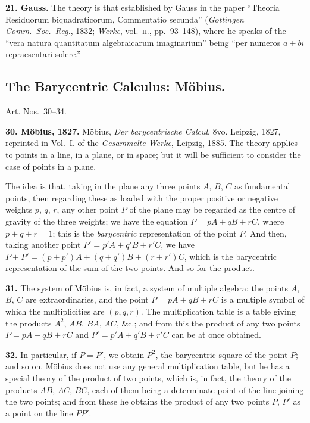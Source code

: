 \documentclass[11pt,a4paper]{article}
\theoremstyle{definition}
\begin{document}
\textbf{21. Gauss.} The theory is that established by Gauss in the paper ``Theoria Residuorum biquadraticorum, Commentatio secunda'' (\textit{Gottingen Comm.\ Soc.\ Reg.}, 1832; \textit{Werke}, vol.~\textsc{ii}., pp.~93--148), where he speaks of the ``vera natura quantitatum algebraicarum imaginarium'' being ``per numeros $a + bi$ repraesentari solere.''

\subsection*{The Barycentric Calculus: M\"obius.}

Art. Nos.~30--34.

\textbf{30. M\"obius, 1827.} M\"obius, \textit{Der barycentrische Calcul}, 8vo. Leipzig, 1827, reprinted in Vol.~I. of the \textit{Gesammelte Werke}, Leipzig, 1885. The theory applies to points in a line, in a plane, or in space; but it will be sufficient to consider the case of points in a plane.

The idea is that, taking in the plane any three points $A$, $B$, $C$ as fundamental points, then regarding these as loaded with the proper positive or negative weights $p$, $q$, $r$, any other point $P$ of the plane may be regarded as the centre of gravity of the three weights; we have the equation $P = pA + qB + rC$, where $p + q + r = 1$; this is the \textit{barycentric} representation of the point $P$. And then, taking another point $P' = p'A + q'B + r'C$, we have $P + P' = (p + p')A + (q + q')B + (r + r')C$, which is the barycentric representation of the sum of the two points. And so for the product.

\textbf{31.} The system of M\"obius is, in fact, a system of multiple algebra; the points $A$, $B$, $C$ are extraordinaries, and the point $P = pA + qB + rC$ is a multiple symbol of which the multiplicities are $(p, q, r)$. The multiplication table is a table giving the products $A^2$, $AB$, $BA$, $AC$, \&c.; and from this the product of any two points $P = pA + qB + rC$ and $P' = p'A + q'B + r'C$ can be at once obtained.

\textbf{32.} In particular, if $P = P'$, we obtain $P^2$, the barycentric square of the point $P$; and so on. M\"obius does not use any general multiplication table, but he has a special theory of the product of two points, which is, in fact, the theory of the products $AB$, $AC$, $BC$, each of them being a determinate point of the line joining the two points; and from these he obtains the product of any two points $P$, $P'$ as a point on the line $PP'$.
\end{document}
